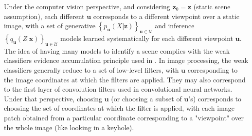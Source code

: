 \documentclass{article} %
\begin{document}

Under the computer vision perspective, and considering $\boldsymbol{z}_0 = \boldsymbol{z}$ (static scene assumption), each different $\boldsymbol{u}$ corresponds to a different viewpoint over a static image, with a set of generative
$ \left\{p_{\boldsymbol{u}}(X|\boldsymbol{z})\right\}_{\boldsymbol{u}\in\mathcal{U}}$
and inference
$ \left\{q_{\boldsymbol{u}}(Z|\boldsymbol{x})\right\}_{\boldsymbol{u}\in\mathcal{U}}$ 
models learned systematically for each different viewpoint $\boldsymbol{u}$. The idea of having many models to identify a scene complies with the weak classifiers evidence accumulation principle used in \cite{viola2003fast}. In image processing, the weak classifiers generally reduce to a set of low-level filters, with $\boldsymbol{u}$ corresponding to the image coordinates at which the filters are applied. They may also correspond to the first layer of convolution filters used in convolutional neural networks. Under that perspective, choosing $\boldsymbol{u}$ (or choosing a subset of $\boldsymbol{u}$'s) corresponds to choosing the set of coordinates at which the filter is applied, with each image patch obtained from a particular coordinate corresponding to a "viewpoint" over the whole image (like looking in a keyhole). 

\end{document}
